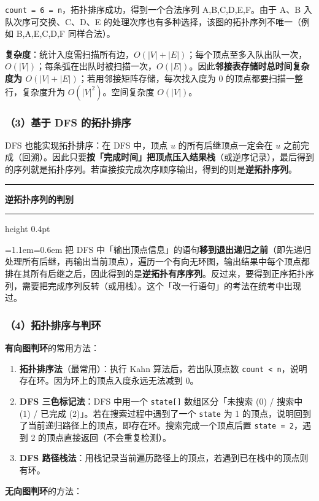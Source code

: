 \documentclass[11pt,openany,UTF8]{ctexbook}
\newcommand{\callouthead}[2]{%
  \par\addvspace{7pt}\noindent
  {\color{#1}\rule[-0.15em]{3pt}{1.05em}}\hspace{0.5em}%
  {\bfseries\color{#1}#2}\par\nobreak\vspace{-0.35em}%
  {\color{rulesep}\hrule height 0.4pt}\nobreak\vspace{0.45em}%
  \begingroup\small\setlength{\parindent}{0pt}%
  \leftskip=1.1em\rightskip=0.6em\noindent\ignorespaces}
\newcommand{\calloutend}{\par\endgroup\addvspace{7pt}}
\newenvironment{callwarn}[1]{\callouthead{warnbar}{#1}}{\calloutend}
\begin{document}
\texttt{count =\allowbreak{} 6 =\allowbreak{} n}，拓扑排序成功，得到一个合法序列 A,B,C,D,E,F。由于 A、B 入队次序可交换、C、D、E 的处理次序也有多种选择，该图的拓扑序列不唯一（例如 B,A,E,C,D,F 同样合法）。

\textbf{复杂度}：统计入度需扫描所有边，$O(|V|+|E|)$；每个顶点至多入队出队一次，$O(|V|)$；每条弧在出队时被扫描一次，$O(|E|)$。因此\textbf{邻接表存储时总时间复杂度为 $O(|V|+|E|)$}；若用邻接矩阵存储，每次找入度为 0 的顶点都要扫描一整行，复杂度升为 $O(|V|^{2})$。空间复杂度 $O(|V|)$。

\subsubsection{（3）基于 DFS 的拓扑排序}

DFS 也能实现拓扑排序：在 DFS 中，顶点 $u$ 的所有后继顶点一定会在 $u$ 之前完成（回溯）。因此只要\textbf{按「完成时间」把顶点压入结果栈}（或逆序记录），最后得到的序列就是拓扑序列。若直接按完成次序顺序输出，得到的则是\textbf{逆拓扑序列}。

\begin{callwarn}{逆拓扑序列的判别}
把 DFS 中「输出顶点信息」的语句\textbf{移到退出递归之前}（即先递归处理所有后继，再输出当前顶点），遍历一个有向无环图，输出结果中每个顶点都排在其所有后继之后，因此得到的是\textbf{逆拓扑有序序列}。反过来，要得到正序拓扑序列，需要把完成序列反转（或用栈）。这个「改一行语句」的考法在统考中出现过。

\end{callwarn}

\subsubsection{（4）拓扑排序与判环}

\textbf{有向图判环}的常用方法：

\begin{enumerate}
\item \textbf{拓扑排序法}（最常用）：执行 Kahn 算法后，若出队顶点数 \texttt{count <\allowbreak{} n}，说明存在环。因为环上的顶点入度永远无法减到 0。
\item \textbf{DFS 三色标记法}：DFS 中用一个 \texttt{state[]\allowbreak{}} 数组区分「未搜索 (0) / 搜索中 (1) / 已完成 (2)」。若在搜索过程中遇到了一个 \texttt{state} 为 1 的顶点，说明回到了当前递归路径上的顶点，即存在环。搜索完成一个顶点后置 \texttt{state =\allowbreak{} 2}，遇到 2 的顶点直接返回（不会重复检测）。
\item \textbf{DFS 路径栈法}：用栈记录当前遍历路径上的顶点，若遇到已在栈中的顶点则有环。
\end{enumerate}
\textbf{无向图判环}的方法：
\end{document}
